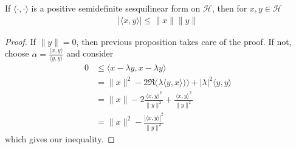\begin{theorem}
  If $\langle \cdot , \cdot \rangle $ is a positive semidefinite
  sesquilinear form on $\mathcal{H}$, then for $x, y \in \mathcal{H}$
  \begin{align*}
    |\langle x , y \rangle | \le \|x\| \|y\|
  \end{align*}
\end{theorem}
\begin{proof}
  If $\|y\| = 0$, then previous proposition takes care of the proof.
  If not, choose $ \alpha =  \frac{\langle x , y \rangle }{ \langle y
  , y \rangle } $ and consider
  \begin{align*}
    0 &\le \langle x - \lambda y , x- \lambda y \rangle \\
  & = \|x\|^2 - 2 \Re \big( \lambda \langle y , x \rangle \big)) +
  |\lambda|^2 \langle y , y \rangle \\
  &= \|x\| - 2 \frac{\langle x , y \rangle^2}{\|y\|^2} +
  \frac{\langle x , y \rangle^2}{\|y\|^2} \\
  &= \|x\|^2 - \frac{|\langle x , y \rangle |^2}{\|y\|^2}
\end{align*}
which gives our inequality.
\end{proof}


